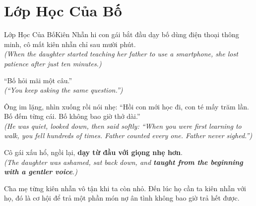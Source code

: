 \section{Lớp Học Của Bố}
\begin{truyen}{Lớp Học Của Bố}{Kiên Nhẫn}
hi con gái bắt đầu dạy bố dùng điện thoại thông minh, cô mất kiên nhẫn chỉ sau mười phút.\\
\textit{(When the daughter started teaching her father to use a smartphone, she lost patience after just ten minutes.)}

``Bố hỏi mãi một câu.''\\
\textit{(``You keep asking the same question.'')}

Ông im lặng, nhìn xuống rồi nói nhẹ: ``Hồi con mới học đi, con té mấy trăm lần. Bố đếm từng cái. Bố không bao giờ thở dài.''\\
\textit{(He was quiet, looked down, then said softly: ``When you were first learning to walk, you fell hundreds of times. Father counted every one. Father never sighed.'')}

Cô gái xấu hổ, ngồi lại, \textbf{dạy từ đầu với giọng nhẹ hơn}.\\
\textit{(The daughter was ashamed, sat back down, and \textbf{taught from the beginning with a gentler voice}.)}
\end{truyen}
\begin{baihoc}
  Cha mẹ từng kiên nhẫn vô tận khi ta còn nhỏ. Đến lúc họ cần ta kiên nhẫn với họ, đó là cơ hội để trả một phần món nợ ân tình không bao giờ trả hết được.
\end{baihoc}

